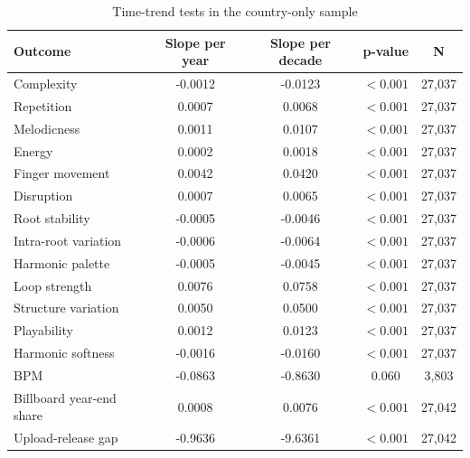 \begin{landscape}
\begin{table}[H]
\centering
\caption{Time-trend tests in the country-only sample}
\label{tab:time_trends}
\begin{tabular}{lcccc}
\toprule
Outcome & Slope per year & Slope per decade & p-value & N \\
\midrule
Complexity & -0.0012 & -0.0123 & $<0.001$ & 27,037 \\
Repetition & 0.0007 & 0.0068 & $<0.001$ & 27,037 \\
Melodicness & 0.0011 & 0.0107 & $<0.001$ & 27,037 \\
Energy & 0.0002 & 0.0018 & $<0.001$ & 27,037 \\
Finger movement & 0.0042 & 0.0420 & $<0.001$ & 27,037 \\
Disruption & 0.0007 & 0.0065 & $<0.001$ & 27,037 \\
Root stability & -0.0005 & -0.0046 & $<0.001$ & 27,037 \\
Intra-root variation & -0.0006 & -0.0064 & $<0.001$ & 27,037 \\
Harmonic palette & -0.0005 & -0.0045 & $<0.001$ & 27,037 \\
Loop strength & 0.0076 & 0.0758 & $<0.001$ & 27,037 \\
Structure variation & 0.0050 & 0.0500 & $<0.001$ & 27,037 \\
Playability & 0.0012 & 0.0123 & $<0.001$ & 27,037 \\
Harmonic softness & -0.0016 & -0.0160 & $<0.001$ & 27,037 \\
BPM & -0.0863 & -0.8630 & 0.060 & 3,803 \\
Billboard year-end share & 0.0008 & 0.0076 & $<0.001$ & 27,042 \\
Upload-release gap & -0.9636 & -9.6361 & $<0.001$ & 27,042 \\
\bottomrule
\end{tabular}
\end{table}
\end{landscape}
